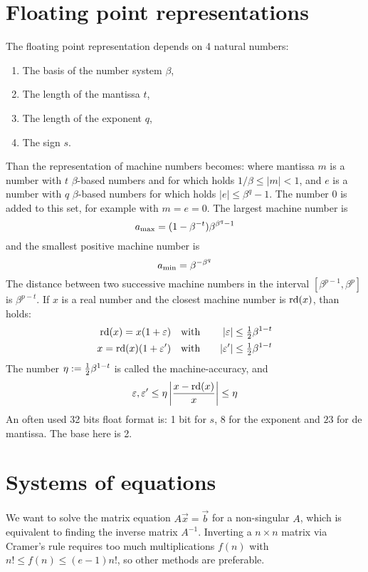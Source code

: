 \documentclass[a4paper,fancyheadings,twoside]{report}
\begin{document}
\section{Floating point representations}
The floating point representation depends on 4 natural numbers:
\begin{enumerate}
\item The basis of the number system $\beta$,
\item The length of the mantissa $t$,
\item The length of the exponent $q$,
\item The sign $s$.
\end{enumerate}
Than the representation of machine numbers becomes: 
where mantissa $m$ is a number with $t$ $\beta$-based numbers and for which holds
$1/\beta\leq|m|<1$, and $e$ is a number with $q$ $\beta$-based numbers for which
holds $|e|\leq\beta^q-1$. The number 0 is added to this set, for example with
$m=e=0$. The largest machine number is
\[
a_{\rm max}=(1-\beta^{-t})\beta^{\beta^q-1}
\]
and the smallest positive machine number is
\[
a_{\rm min}=\beta^{-\beta^q}
\]
The distance between two successive machine numbers in the interval
$[\beta^{p-1},\beta^p]$ is $\beta^{p-t}$. If $x$ is a real number and the
closest machine number is ${\rm rd}(x)$, than holds:
\begin{eqnarray*}
{\rm rd}(x)=x(1+\varepsilon) &~~~\mbox{with}~~~&|\varepsilon|\leq\mbox{$\frac{1}{2}$}\beta^{1-t}\\
x={\rm rd}(x)(1+\varepsilon')&~~~\mbox{with}~~~&|\varepsilon'|\leq\mbox{$\frac{1}{2}$}\beta^{1-t}
\end{eqnarray*}
The number $\eta:=\mbox{$\frac{1}{2}$}\beta^{1-t}$ is called the machine-accuracy, and
\[
\varepsilon,\varepsilon'\leq\eta\left|\frac{x-{\rm rd}(x)}{x}\right|\leq\eta
\]
An often used 32 bits float format is: 1 bit for $s$, 8 for the exponent
and $23$ for de mantissa. The base here is 2.

\section{Systems of equations}
We want to solve the matrix equation $A\vec{x}=\vec{b}$ for a non-singular
$A$, which is equivalent to finding the inverse matrix $A^{-1}$. Inverting
a $n\times n$ matrix via Cramer's rule requires too much multiplications
$f(n)$ with $n!\leq f(n)\leq (e-1)n!$, so other methods are preferable.
\end{document}
